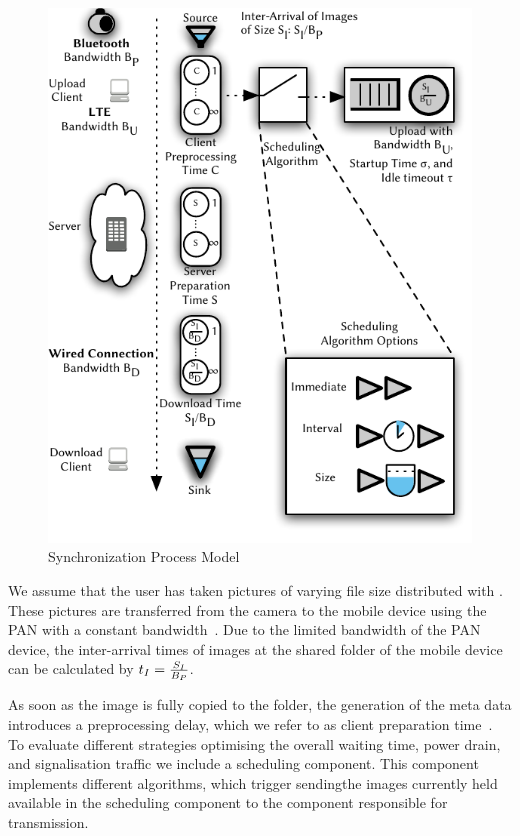 \begin{figure}
\centering
\includegraphics[width=\columnwidth]{application/cloud_file_synchronization/system_model/figures/model}
\caption{Synchronization Process Model}
\label{fig:application:cloud_file_synchronisation:system_model:model_metrics:model}
\end{figure}

We assume that the user has taken pictures of varying file size distributed with \imageFileSize.
These pictures are transferred from the camera to the mobile device using the \gls{PAN} with a constant bandwidth~\panTransferRate.
Due to the limited bandwidth \panTransferRate of the \gls{PAN} device, the inter-arrival times of images at the \dropbox shared folder of the mobile device can be calculated by \(t_I = \frac{S_I}{B_{P}}\).

As soon as the image is fully copied to the \dropbox folder, the generation of the meta data introduces a preprocessing delay, which we refer to as client preparation time~\clientpreparationtime.
To evaluate different strategies optimising the overall waiting time, power drain, and signalisation traffic we include a scheduling component.
This component implements different algorithms, which trigger sendingthe images currently held available in the scheduling component to the component responsible for transmission.


